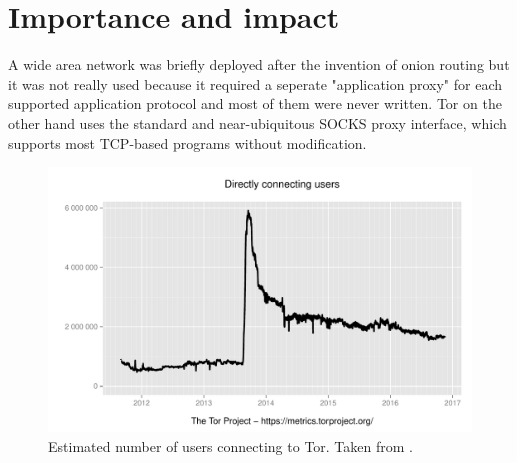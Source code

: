


\section{Importance and impact}
A wide area network was briefly deployed after the invention of onion routing but it was not really used because it required a seperate "application proxy" for each supported application protocol and most of them were never written. Tor on the other hand uses the standard and near-ubiquitous SOCKS proxy interface, which supports most TCP-based programs without modification.

\begin{figure}
	\includegraphics[width=\columnwidth]{img/userstats.pdf}
	\caption{Estimated number of users connecting to Tor. Taken from \cite{tormetrics}.}
	\label{img_userstats}
\end{figure}

